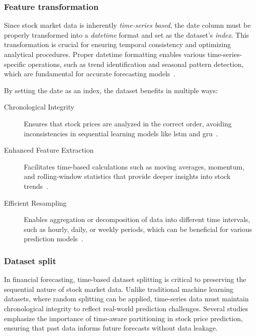 \subsubsection{Feature transformation}

Since stock market data is inherently \emph{time-series based}, the date column must be properly transformed 
into a \emph{datetime} format and set as the dataset's \emph{index}. This transformation is crucial for 
ensuring temporal consistency and optimizing analytical procedures. Proper datetime formatting enables 
various time-series-specific operations, such as trend identification and seasonal pattern detection, which 
are fundamental for accurate forecasting models~\parencite{chang2024StockPrediction}.

By setting the date as an index, the dataset benefits in multiple ways:
\begin{description}
    \item[Chronological Integrity] Ensures that stock prices are analyzed in the correct order,
    avoiding inconsistencies in sequential learning models like \acrshort{lstm} and \acrshort{gru}~\parencite{guo2024LSTMStock}.
    \item[Enhanced Feature Extraction] Facilitates time-based calculations such as moving averages, 
    momentum, and rolling-window statistics that provide deeper insights into stock 
    trends~\parencite{shaban2024SMPDL}.
    \item[Efficient Resampling] Enables aggregation or decomposition of data into different time 
    intervals, such as hourly, daily, or weekly periods, which can be beneficial for various prediction 
    models~\parencite{agrawal2022StockPrediction}.
\end{description} 

\subsubsection{Dataset split}

In financial forecasting, time-based dataset splitting is critical to
preserving the sequential nature of stock market data. Unlike traditional
machine learning datasets, where random splitting can be applied, time-series
data must maintain chronological integrity to reflect real-world prediction
challenges. Several studies emphasize the importance of time-aware partitioning
in stock price prediction, ensuring that past data informs future forecasts
without data leakage.

